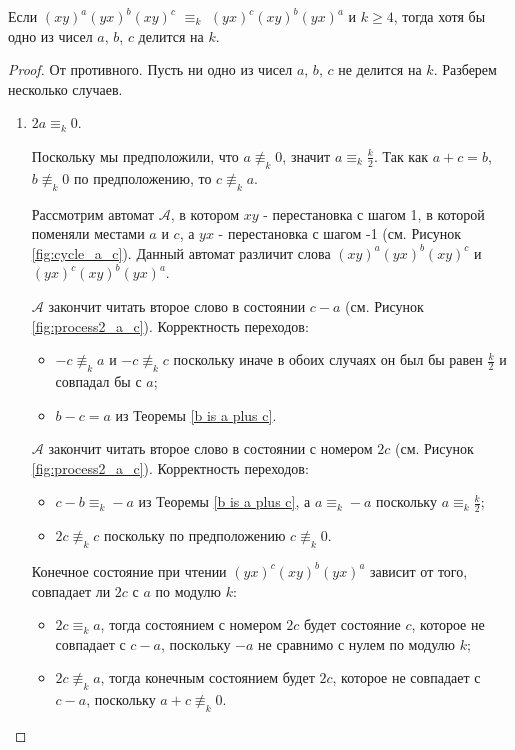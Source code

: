 	\begin{lemma}\label{abc div k}
		Если $(xy)^a(yx)^b(xy)^c$ $\equiv_k$ $(yx)^c(xy)^b(yx)^a$ и $k \ge 4$, тогда хотя бы одно из чисел $a$, $b$, $c$ делится на $k$.
	\end{lemma}
	\begin{proof}
		От противного. Пусть ни одно из чисел $a$, $b$, $c$ не делится на $k$. Разберем несколько случаев.
		\begin{enumerate}
			\item $2a \equiv_k 0$.
			
			Поскольку мы предположили, что $a \not \equiv_k 0$, значит $a \equiv_k \frac{k}{2}$. Так как $a+c=b$, $b \not \equiv_k 0$ по предположению, то $c \not \equiv_k a$.
			
			
			Рассмотрим автомат $\mathscr{A}$, в котором $xy$ - перестановка с шагом 1, в которой поменяли местами $a$ и $c$, а $yx$ - перестановка с шагом -1 (см. Рисунок \ref{fig:cycle_a_c}). Данный автомат различит слова $(xy)^a(yx)^b(xy)^c$ и $(yx)^c(xy)^b(yx)^a$. 
						
			$\mathscr{A}$ закончит читать второе слово в состоянии $c-a$ (см. Рисунок \ref{fig:process2_a_c}).
			Корректность переходов:
			\begin{itemize}
				\item $-c \not \equiv_k a$ и $-c \not \equiv_k c$ поскольку иначе в обоих случаях он был бы равен $\frac{k}{2}$ и совпадал бы с $a$;
				\item $b-c = a$ из Теоремы \ref{b is a plus c}.
			\end{itemize}
			
			$\mathscr{A}$ закончит читать второе слово в состоянии с номером $2c$ (см. Рисунок \ref{fig:process2_a_c}).
			Корректность переходов:
			\begin{itemize}
				\item $c-b \equiv_k -a$ из Теоремы \ref{b is a plus c}, а $a \equiv_k -a$ поскольку $a \equiv_k \frac{k}{2}$;
				\item $2c \not \equiv_k c$ поскольку по предположению $c \not \equiv_k 0$.
			\end{itemize}
			Конечное состояние при чтении $(yx)^c(xy)^b(yx)^a$ зависит от того, совпадает ли $2c$ с $a$ по модулю $k$:
			\begin{itemize}
				\item $2c \equiv_k a$, тогда состоянием с номером $2c$ будет состояние $c$, которое не совпадает с $c-a$, поскольку $-a$ не сравнимо с нулем по модулю $k$;
				\item $2c \not \equiv_k a$, тогда конечным состоянием будет $2c$, которое не совпадает с $c-a$, поскольку $a+c \not \equiv_k 0$.
			\end{itemize}
			

\end{enumerate}
\end{proof}

